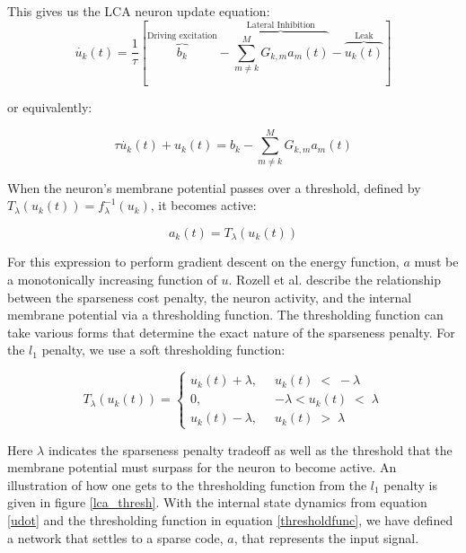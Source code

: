This gives us the LCA neuron update equation:
\begin{equation}\label{udot}
    \dot{u_{k}}(t) = \frac{1}{\tau} \left[\overbrace{b_{k}}^\text{Driving excitation} - \overbrace{\sum_{m \neq k}^{M}G_{k,m}a_{m}(t)}^\text{Lateral Inhibition} - \overbrace{u_{k}(t)}^\text{Leak} \right]
\end{equation}

or equivalently:

\begin{displaymath}
    \tau \dot{u_{k}}(t) + u_{k}(t) =  b_{k} - \sum_{m \neq k}^{M}G_{k,m}a_{m}(t)
\end{displaymath}

When the neuron's membrane potential passes over a threshold, defined by $T_{\lambda}(u_{k}(t)) = f_{\lambda}^{-1}(u_{k})$, it becomes active:

\begin{equation}
a_{k}(t) = T_{\lambda}(u_{k}(t))
\end{equation}

For this expression to perform gradient descent on the energy function, $a$ must be a monotonically increasing function of $u$.  Rozell et al. describe the relationship between the sparseness cost penalty, the neuron activity, and the internal membrane potential via a thresholding function. The thresholding function can take various forms that determine the exact nature of the sparseness penalty. For the $l_{1}$ penalty, we use a soft thresholding function:

\begin{equation}
    T_{\lambda}(u_{k}(t)) = \left\{
    \begin{aligned}
        u_{k}(t)+\lambda,\;\; &u_{k}(t)\; <\; -\lambda \\
        0,\;\; &-\lambda < u_{k}(t)\; <\; \lambda \\
        u_{k}(t)-\lambda,\;\; &u_{k}(t)\; >\; \lambda
    \end{aligned}
    \right.
\label{thresholdfunc}
\end{equation}

Here $\lambda$ indicates the sparseness penalty tradeoff as well as the threshold that the membrane potential must surpass for the neuron to become active. An illustration of how one gets to the thresholding function from the $l_{1}$ penalty is given in figure \ref{lca_thresh}. With the internal state dynamics from equation \eqref{udot} and the thresholding function in equation \eqref{thresholdfunc}, we have defined a network that settles to a sparse code, $a$, that represents the input signal.

